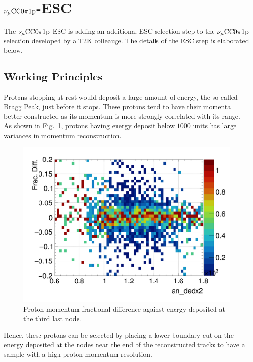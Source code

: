 \section{$\nu_{\mu}\textrm{CC}0\pi1\textrm{p}$-ESC}
\label{sec:sel-esc}
     The $\nu_{\mu}\textrm{CC}0\pi1\textrm{p}$-ESC is adding an additional ESC selection step to the $\nu_{\mu}\textrm{CC}0\pi1\textrm{p}$ selection developed by a T2K colleauge.
     The details of the ESC step is elaborated below.
    \subsection{Working Principles}
    \label{sec:sel-esc-wp}
    Protons stopping at rest would deposit a large amount of energy, the so-called Bragg Peak, just before it stops.
    These protons tend to have their momenta better constructed as its momentum is more strongly correlated with its range. 
    As shown in Fig.~\ref{fig:dedx-pprres-eg}, protons having energy deposit below $1000$ units has large variances in momentum reconstruction. 
    \begin{figure}[h]
        \centering
        \includegraphics[width=0.5\linewidth]{figures/sel/an_dedx2_colnor_vs_p_pr_res_hist2d_al12_zoom.png}
        \caption{Proton momentum fractional difference against energy deposited at the third last node.}
        \label{fig:dedx-pprres-eg}
    \end{figure}
    Hence, these protons can be selected by placing a lower boundary cut on the energy deposited at the nodes near the end of the reconstructed tracks to have a sample with a high proton momentum resolution.   
    
